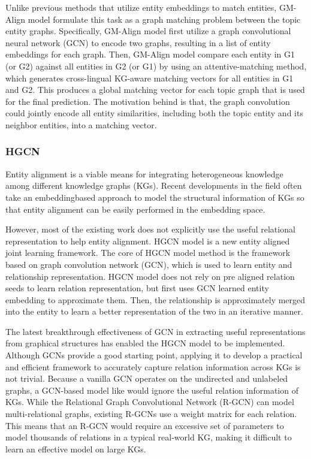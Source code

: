 \documentclass[sigconf]{acmart}
\begin{document}
{Unlike previous methods that utilize entity embeddings to match entities, GM-Align model formulate this task as a graph matching problem between the topic entity graphs. Specifically, GM-Align model first utilize a graph convolutional neural network (GCN) to encode two graphs, resulting in a list of entity embeddings for each graph. Then, GM-Align model compare each entity in G1 (or G2) against all entities in G2 (or G1) by using an attentive-matching method, which generates cross-lingual KG-aware matching vectors for all entities in G1 and G2. This produces a global matching vector for each topic graph that is used for the final prediction. The motivation behind is that, the graph convolution could jointly encode all entity similarities, including both the topic entity and its neighbor entities, into a matching vector.

\subsubsection{HGCN \cite{wu2019jointly}}

Entity alignment is a viable means for integrating heterogeneous knowledge among different knowledge graphs (KGs). Recent developments in the field often take an embeddingbased approach to model the structural information of KGs so that entity alignment can be easily performed in the embedding space.

However, most of the existing work does not explicitly use the useful relational representation to help entity alignment. HGCN model is a new entity aligned joint learning framework. The core of HGCN model method is the framework based on graph convolution network (GCN), which is used to learn entity and relationship representation. HGCN model does not rely on pre aligned relation seeds to learn relation representation, but first uses GCN learned entity embedding to approximate them. Then, the relationship is approximately merged into the entity to learn a better representation of the two in an iterative manner.

The latest breakthrough effectiveness of GCN in extracting useful representations from graphical structures has enabled the HGCN model to be implemented. Although GCNs provide a good starting point, applying it to develop a practical and efficient framework to accurately capture relation information across KGs is not trivial. Because a vanilla GCN operates on the undirected and unlabeled graphs, a GCN-based model like would ignore the useful relation information of KGs. While the Relational Graph Convolutional Network (R-GCN) can model multi-relational graphs, existing R-GCNs use a weight matrix for each relation. This means that an R-GCN would require an excessive set of parameters to model thousands of relations in a typical real-world KG, making it difficult to learn an effective model on large KGs.

}
\end{document}
